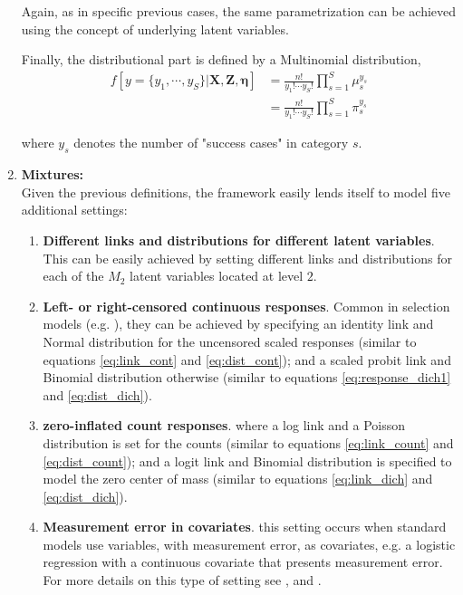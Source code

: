 \begin{enumerate}
{	Again, as in specific previous cases, the same parametrization can be achieved using the concept of underlying latent variables.
	
	Finally, the distributional part is defined by a Multinomial distribution,
	\begin{equation} \label{eq:dist_rank}
		\begin{split}
			f[y=\{y_{1}, \cdots, y_{S}\} | \mathbf{X}, \mathbf{Z}, \pmb{\eta}] &= \frac{n!}{y_{1}! \cdots y_{S}!} \prod_{s=1}^{S} \mu_{s}^{y_{s}} \\
			&= \frac{n!}{y_{1}! \cdots y_{S}!} \prod_{s=1}^{S} \pi_{s}^{y_{s}}
		\end{split}
	\end{equation}
	
	where $y_{s}$ denotes the number of "success cases" in category $s$.
	}


		
	\item \textbf{Mixtures:} \\
	Given the previous definitions, the framework easily lends itself to model five additional settings:
	
	\begin{enumerate}
		\item \textbf{Different links and distributions for different latent variables}. This can be easily achieved by setting different links and distributions for each of the $M_{2}$ latent variables located at level $2$.
		
		
		\item \textbf{Left- or right-censored continuous responses}. Common in selection models (e.g. \citealp{Hekman_1979}), they can be achieved by specifying an identity link and Normal distribution for the uncensored scaled responses (similar to equations \ref{eq:link_cont} and \ref{eq:dist_cont}); and a scaled probit link and Binomial distribution otherwise (similar to equations \ref{eq:response_dich1} and \ref{eq:dist_dich}).
		
		
		\item \textbf{zero-inflated count responses}. where a log link and a Poisson distribution is set for the counts (similar to equations \ref{eq:link_count} and \ref{eq:dist_count}); and a logit link and Binomial distribution is specified to model the zero center of mass (similar to equations \ref{eq:link_dich} and \ref{eq:dist_dich}).
		
		
		\item \textbf{Measurement error in covariates}. this setting occurs when standard models use variables, with measurement error, as covariates, e.g. a logistic regression with a continuous covariate that presents measurement error. For more details on this type of setting see \citet{Rabe_et_al_2003a, Rabe_et_al_2003b}, and \citet{Skrondal_et_al_2003b}.
		

\end{enumerate}
\end{enumerate}
